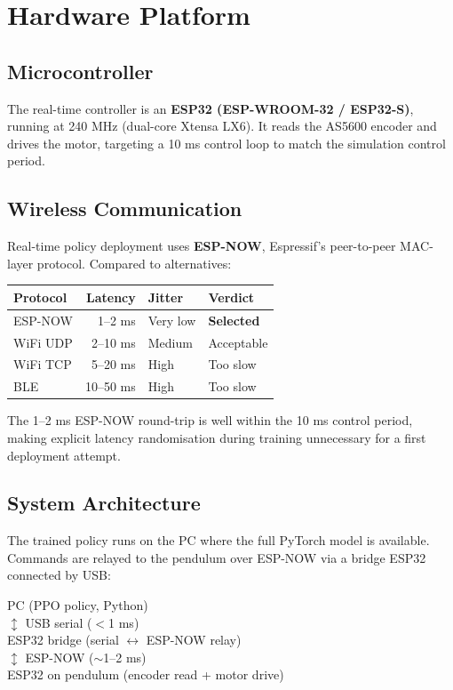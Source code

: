 \documentclass[12pt,a4paper]{article}
\begin{document}
\section{Hardware Platform}

\subsection{Microcontroller}

The real-time controller is an \textbf{ESP32 (ESP-WROOM-32 / ESP32-S)},
running at 240 MHz (dual-core Xtensa LX6). It reads the AS5600 encoder and
drives the motor, targeting a 10 ms control loop to match the simulation
control period.

\subsection{Wireless Communication}

Real-time policy deployment uses \textbf{ESP-NOW}, Espressif's peer-to-peer
MAC-layer protocol. Compared to alternatives:

\begin{center}
\begin{tabular}{lrll}
\toprule
\textbf{Protocol} & \textbf{Latency} & \textbf{Jitter} & \textbf{Verdict} \\
\midrule
ESP-NOW   & 1--2 ms   & Very low & \textbf{Selected} \\
WiFi UDP  & 2--10 ms  & Medium   & Acceptable \\
WiFi TCP  & 5--20 ms  & High     & Too slow \\
BLE       & 10--50 ms & High     & Too slow \\
\bottomrule
\end{tabular}
\end{center}

\noindent The 1--2 ms ESP-NOW round-trip is well within the 10 ms control
period, making explicit latency randomisation during training unnecessary for
a first deployment attempt.

\subsection{System Architecture}

The trained policy runs on the PC where the full PyTorch model is available.
Commands are relayed to the pendulum over ESP-NOW via a bridge ESP32 connected
by USB:

\medskip
\begin{center}
\ttfamily
PC (PPO policy, Python)\\
$\updownarrow$ USB serial ($<$1 ms)\\
ESP32 bridge (serial $\leftrightarrow$ ESP-NOW relay)\\
$\updownarrow$ ESP-NOW ($\sim$1--2 ms)\\
ESP32 on pendulum (encoder read + motor drive)
\end{center}
\medskip
\end{document}
